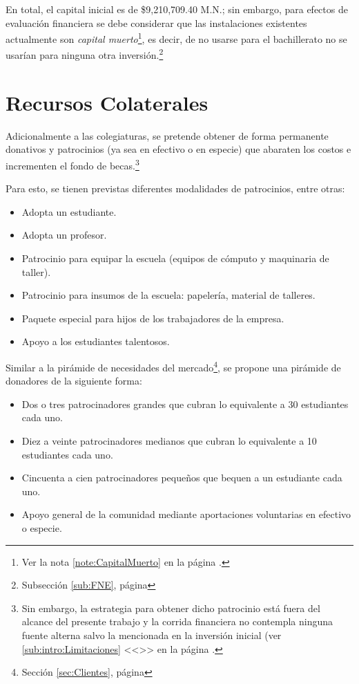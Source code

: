 En total, el capital inicial es de \$9,210,709.40 M.N.; sin embargo, para efectos de evaluación financiera se debe considerar que las instalaciones existentes actualmente son \emph{capital muerto}\footnote{Ver la nota \ref{note:CapitalMuerto} en la página \pageref{note:CapitalMuerto}.}, es decir, de no usarse para el bachillerato no se usarían para ninguna otra inversión.\footnote{Subsección \ref{sub:FNE}, página \pageref{sub:FNE}}

\section{Recursos Colaterales}
\label{sec:RecursosColaterales}

Adicionalmente a las colegiaturas, se pretende obtener de forma permanente donativos y patrocinios (ya sea en efectivo o en especie) que abaraten los costos e incrementen el fondo de becas.\footnote{Sin embargo, la estrategia para obtener dicho patrocinio está fuera del alcance del presente trabajo y la corrida financiera no contempla ninguna fuente alterna salvo la mencionada en la inversión inicial (ver \ref{sub:intro:Limitaciones} <<>> en la página \pageref{sub:intro:Limitaciones}.}

Para esto, se tienen previstas diferentes modalidades de patrocinios, entre otras:

\begin{itemize}
	\item Adopta un estudiante.
	\item Adopta un profesor.
	\item Patrocinio para equipar la escuela (equipos de cómputo y maquinaria de taller).
	\item Patrocinio para insumos de la escuela: papelería, material de talleres.
	\item Paquete especial para hijos de los trabajadores de la empresa.
	\item Apoyo a los estudiantes talentosos.
\end{itemize}

Similar a la pirámide de necesidades del mercado\footnote{Sección \ref{sec:Clientes}, página \pageref{sec:Clientes}}, se propone una pirámide de donadores de la siguiente forma:

\begin{itemize}
	\item Dos o tres patrocinadores grandes que cubran lo equivalente a 30 estudiantes cada uno.
	\item Diez a veinte patrocinadores medianos que cubran lo equivalente a 10 estudiantes cada uno.
	\item Cincuenta a cien patrocinadores pequeños que bequen a un estudiante cada uno.
	\item Apoyo general de la comunidad mediante aportaciones voluntarias en efectivo o especie.
\end{itemize}

